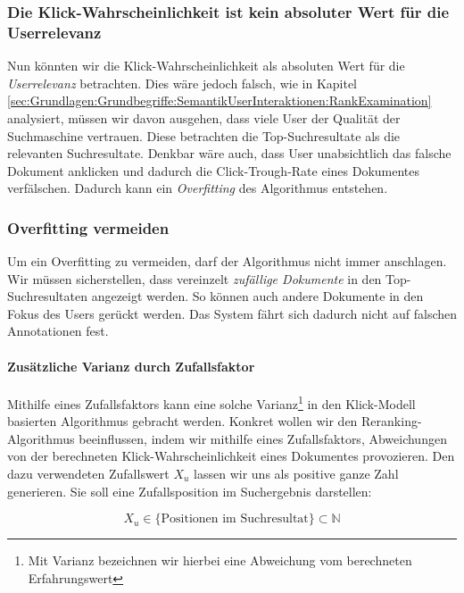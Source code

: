 \subsubsection{Die Klick-Wahrscheinlichkeit ist kein absoluter Wert für die Userrelevanz}
\label{sec:Reranking:Methodik:Vergessen:Relevanzfeedback}

Nun könnten wir die Klick-Wahrscheinlichkeit als absoluten Wert für die \textit{Userrelevanz} betrachten. Dies wäre jedoch falsch, wie in Kapitel \ref{sec:Grundlagen:Grundbegriffe:SemantikUserInteraktionen:RankExamination} analysiert, müssen wir davon ausgehen, dass viele User der Qualität der Suchmaschine vertrauen. Diese betrachten die \glqq Top-Suchresultate\grqq{} als die relevanten Suchresultate. Denkbar wäre auch, dass User unabsichtlich das falsche Dokument anklicken und dadurch die Click-Trough-Rate eines Dokumentes verfälschen. Dadurch kann ein \textit{Overfitting} des Algorithmus entstehen.

\subsubsection{Overfitting vermeiden}
\label{sec:Reranking:Methodik:Vergessen:Overfitting}

Um ein Overfitting zu vermeiden, darf der Algorithmus nicht immer anschlagen. Wir müssen sicherstellen, dass vereinzelt \textit{zufällige Dokumente} in den \glqq Top-Suchresultaten\grqq{} angezeigt werden. So können auch andere Dokumente in den Fokus des Users gerückt werden. Das System fährt sich dadurch nicht auf falschen Annotationen fest. 

\paragraph{Zusätzliche Varianz durch Zufallsfaktor} 
Mithilfe eines Zufallsfaktors kann eine solche Varianz\footnote{Mit Varianz bezeichnen wir hierbei eine Abweichung vom berechneten Erfahrungswert} in den Klick-Modell basierten Algorithmus gebracht werden. Konkret wollen wir den Reranking-Algorithmus beeinflussen, indem wir mithilfe eines Zufallsfaktors, Abweichungen von der berechneten Klick-Wahrscheinlichkeit eines Dokumentes provozieren. Den dazu verwendeten Zufallswert $X_{u}$  lassen wir uns als positive ganze Zahl generieren. Sie soll eine Zufallsposition im Suchergebnis darstellen:

\begin{equation}	
	X_{u} \in \lbrace \text{Positionen im Suchresultat} \rbrace \subset \mathbb{N}
\end{equation}

